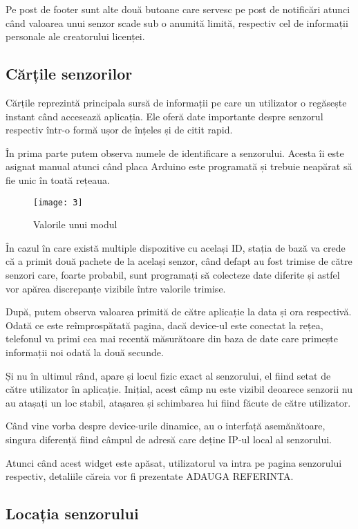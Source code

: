 Pe post de footer sunt alte două butoane care servesc pe post de notificări atunci când valoarea unui senzor scade sub o anumită limită, respectiv cel de informații personale ale creatorului licenței.

\subsection{Cărțile senzorilor}

Cărțile reprezintă principala sursă de informații pe care un utilizator o regăsește instant când accesează aplicația. Ele oferă date importante despre senzorul respectiv într-o formă ușor de înțeles și de citit rapid.

În prima parte putem observa numele de identificare a senzorului. Acesta îi este asignat manual atunci când placa Arduino este programată și trebuie neapărat să fie unic în toată rețeaua. 

\begin{wrapfigure}{r}{0.4\textwidth}
	\texttt{[image: 3]}
	\caption{Valorile unui modul}
	\label{fig:3}
\end{wrapfigure}

În cazul în care există multiple dispozitive cu același ID, stația de bază va crede că a primit două pachete de la același senzor, când defapt au fost trimise de către senzori care, foarte probabil, sunt programați să colecteze date diferite și astfel vor apărea discrepanțe vizibile între valorile trimise.

După, putem observa valoarea primită de către aplicație la data și ora respectivă. Odată ce este reîmprospătată pagina, dacă device-ul este conectat la rețea, telefonul va primi cea mai recentă măsurătoare din baza de date care primește informații noi odată la două secunde.

Și nu în ultimul rând, apare și locul fizic exact al senzorului, el fiind setat de către utilizator în aplicație. Inițial, acest câmp nu este vizibil deoarece senzorii nu au atașați un loc stabil, atașarea și schimbarea lui fiind făcute de către utilizator.

Când vine vorba despre device-urile dinamice, au o interfață asemănătoare, singura diferență fiind câmpul de adresă care deține IP-ul local al senzorului.

Atunci când acest widget este apăsat, utilizatorul va intra pe pagina senzorului respectiv, detaliile căreia vor fi prezentate ADAUGA REFERINTA.

\subsection{Locația senzorului}

